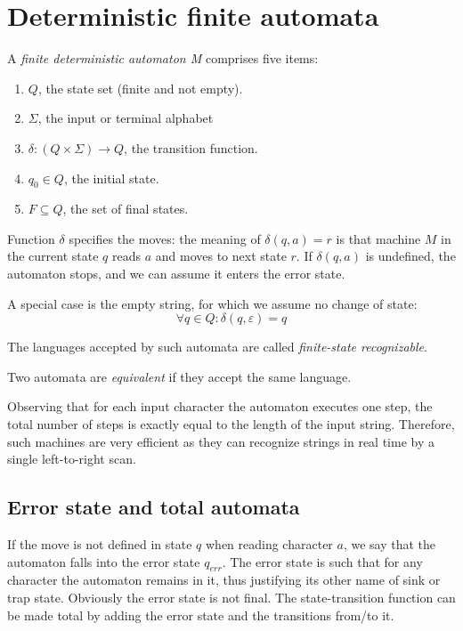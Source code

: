 \section{Deterministic finite automata}

\begin{definition}
    A \emph{finite deterministic automaton M} comprises five items:
    \begin{enumerate}
        \item $Q$, the state set (finite and not empty). 
        \item $\Sigma$, the input or terminal alphabet
        \item $\delta:(Q \times \Sigma) \rightarrow Q$, the transition function.
        \item $q_0 \in Q$, the initial state. 
        \item $F\subseteq Q$, the set of final states.
    \end{enumerate}
\end{definition}
Function $\delta$ specifies the moves: the meaning of $\delta(q,a)=r$ is that machine $M$ in the current state $q$ reads $a$ and moves to next state $r$. 
If $\delta(q,a)$ is undefined, the automaton stops, and we can assume it enters the error state. 

A special case is the empty string, for which we assume no change of state: 
\[\forall q \in Q:\delta(q,\varepsilon)=q\]
\begin{definition}
    The languages accepted by such automata are called \emph{finite-state recognizable}.
    
    Two automata are \emph{equivalent} if they accept the same language.
\end{definition}
Observing that for each input character the automaton executes one step, the total number of steps is exactly equal to the length of the input string. Therefore, such
machines are very efficient as they can recognize strings in real time by a single left-to-right scan.

\subsection*{Error state and total automata}
If the move is not defined in state $q$ when reading character $a$, we say that the automaton falls into the error state $q_{err}$. The error state is such that for 
any character the automaton remains in it, thus justifying its other name of sink or trap state. Obviously the error state is not final. The state-transition function 
can be made total by adding the error state and the transitions from/to it. 

